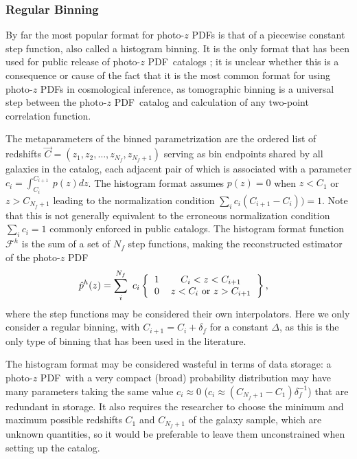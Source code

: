 \documentclass[\docopts]{\docclass}
\newcommand{\pz}{photo-$z$ PDF}
\begin{document}
\subsubsection{Regular Binning}
\label{sec:bins}

By far the most popular format for \pz s is that of a piecewise constant step 
function, also called a histogram binning.  It is the only format that has been 
used for public release of \pz\ catalogs \citep{tanaka_photometric_2017, 
sheldon_photometric_2012}; it is unclear whether this is a consequence or cause 
of the fact that it is the most common format for using \pz s in cosmological 
inference, as tomographic binning is a universal step between the \pz\ catalog 
and calculation of any two-point correlation function.

The metaparameters of the binned parametrization are the ordered list of 
redshifts $\vec{C} = (z_{1}, z_{2}, \dots, z_{N_{f}}, z_{N_{f}+1})$ serving as 
bin endpoints shared by all galaxies in the catalog, each adjacent pair of 
which is associated with a parameter $c_{i}=\int_{C_{i}}^{C_{i+1}}\ p(z)dz$.  
The histogram format assumes $p(z)=0$ when $z<C_{1}$ or $z>C_{N_{f}+1}$ leading 
to the normalization condition $\sum_{i} c_{i}(C_{i+1}-C_{i})) = 1$.  Note that 
this is not generally equivalent to the erroneous normalization condition 
$\sum_{i} c_{i} = 1$ commonly enforced in public catalogs.  The histogram 
format function $\mathcal{F}^{h}$ is the sum of a set of $N_{f}$ step 
functions, making the reconstructed estimator of the \pz
\begin{align}
  \label{eq:binned}
  \hat{p}^{h}(z) &= \sum_{i}^{N_{f}}\ c_{i} 
\left\{\begin{tabular}{cc}$1$&$C_{i}<z<C_{i+1}$\\
0&$z < C_{i}$\ or\ $z > C_{i+1}$\end{tabular}\right\},
\end{align}
where the step functions may be considered their own interpolators.  Here we 
only consider a regular binning, with $C_{i+1}=C_{i}+\delta_{f}$ for a constant 
$\Delta$, as this is the only type of binning that has been used in the 
literature.

The histogram format may be considered wasteful in terms of data storage: a 
\pz\ with a very compact (broad) probability distribution may have many 
parameters taking the same value $c_{i}\approx0$ 
($c_{i}\approx(C_{N_{f}+1}-C_{1})\delta_{f}^{-1}$) that are redundant in 
storage.  It also requires the researcher to choose the minimum and maximum 
possible redshifts $C_{1}$ and $C_{N_{f}+1}$ of the galaxy sample, which are 
unknown quantities, so it would be preferable to leave them unconstrained when 
setting up the catalog.
\end{document}
